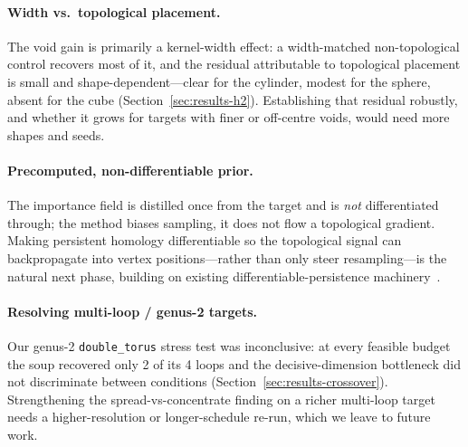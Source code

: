 \paragraph{Width vs.\ topological placement.}
The void gain is primarily a kernel-width effect: a width-matched non-topological
control recovers most of it, and the residual attributable to topological placement
is small and shape-dependent---clear for the cylinder, modest for the sphere, absent
for the cube (Section~\ref{sec:results-h2}). Establishing that residual robustly, and
whether it grows for targets with finer or off-centre voids, would need more shapes
and seeds.

\paragraph{Precomputed, non-differentiable prior.}
The importance field is distilled once from the target and is \emph{not}
differentiated through; the method biases sampling, it does not flow a topological
gradient. Making persistent homology differentiable so the topological signal can
backpropagate into vertex positions---rather than only steer resampling---is the
natural next phase, building on existing differentiable-persistence
machinery~\cite{gabrielsson2020topologylayer,carriere2021optimizing,poulenard2018shapematching}.

\paragraph{Resolving multi-loop / genus-2 targets.}
Our genus-2 \texttt{double\_torus} stress test was inconclusive: at every feasible
budget the soup recovered only 2 of its 4 loops and the decisive-dimension
bottleneck did not discriminate between conditions
(Section~\ref{sec:results-crossover}). Strengthening the spread-vs-concentrate
finding on a richer multi-loop target needs a higher-resolution or longer-schedule
re-run, which we leave to future work.
